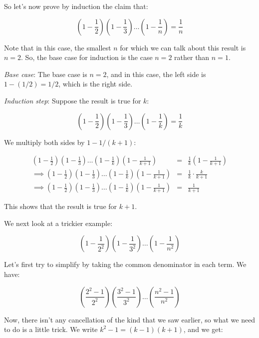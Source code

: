 \documentclass{amsart}
\begin{document}
So let's now prove by induction the claim that:

\begin{equation*}
  \left(1 - \frac{1}{2}\right) \left(1 - \frac{1}{3}\right) \dots \left(1 - \frac{1}{n}\right) = \frac{1}{n}
\end{equation*}

Note that in this case, the smallest $n$ for which we can talk about
this result is $n = 2$. So, the base case for induction is the case $n
= 2$ rather than $n = 1$.

{\em Base case}: The base case is $n = 2$, and in this case, the left
side is $1 - (1/2) = 1/2$, which is the right side.

{\em Induction step}: Suppose the result is true for $k$:

\begin{equation*}
  \left(1 - \frac{1}{2}\right) \left(1 - \frac{1}{3}\right) \dots \left(1 - \frac{1}{k}\right) = \frac{1}{k}
\end{equation*}

We multiply both sides by $1 - 1/(k+1)$:

\begin{eqnarray*}
  \left(1 - \frac{1}{2}\right) \left(1 - \frac{1}{3}\right) \dots \left(1 - \frac{1}{k}\right)\left(1 -\frac{1}{k + 1}\right) & = & \frac{1}{k}\left(1 - \frac{1}{k+1}\right)\\
  \implies \left(1 - \frac{1}{2}\right) \left(1 - \frac{1}{3}\right) \dots \left(1 - \frac{1}{k}\right)\left(1 -\frac{1}{k + 1}\right) & = & \frac{1}{k} \cdot \frac{k}{k + 1}\\
  \implies \left(1 - \frac{1}{2}\right) \left(1 - \frac{1}{3}\right) \dots \left(1 - \frac{1}{k}\right)\left(1 -\frac{1}{k + 1}\right) & = & \frac{1}{k + 1}
\end{eqnarray*}

This shows that the result is true for $k + 1$.

We next look at a trickier example:

$$\left(1 - \frac{1}{2^2}\right)\left(1 - \frac{1}{3^2}\right) \dots \left(1 - \frac{1}{n^2}\right)$$

Let's first try to simplify by taking the common denominator in each
term. We have:

$$\left(\frac{2^2 - 1}{2^2} \right)\left(\frac{3^2 - 1}{3^2}\right) \dots \left(\frac{n^2 - 1}{n^2}\right)$$

Now, there isn't any cancellation of the kind that we saw earlier, so
what we need to do is a little trick. We write $k^2 - 1 = (k - 1)(k +
1)$, and we get:
\end{document}
